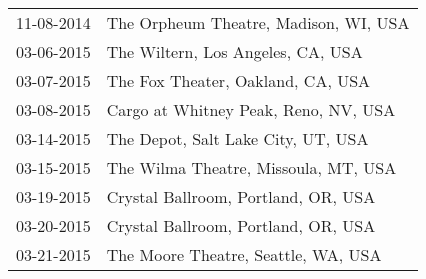 \begin{supertabular}{ll}
 11-08-2014 &  The Orpheum Theatre, Madison, WI, USA \\
 03-06-2015 &      The Wiltern, Los Angeles, CA, USA \\
 03-07-2015 &      The Fox Theater, Oakland, CA, USA \\
 03-08-2015 &   Cargo at Whitney Peak, Reno, NV, USA \\
 03-14-2015 &     The Depot, Salt Lake City, UT, USA \\
 03-15-2015 &   The Wilma Theatre, Missoula, MT, USA \\
 03-19-2015 &    Crystal Ballroom, Portland, OR, USA \\
 03-20-2015 &    Crystal Ballroom, Portland, OR, USA \\
 03-21-2015 &    The Moore Theatre, Seattle, WA, USA \\
\end{supertabular}
